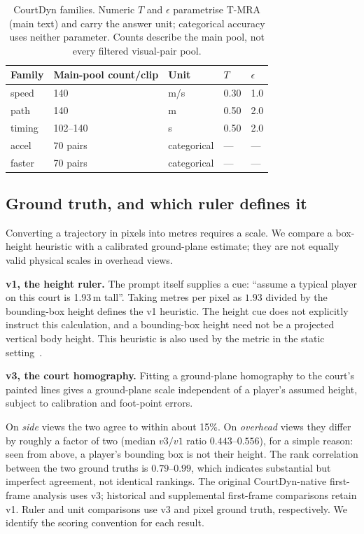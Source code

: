 \documentclass[11pt]{article}
\begin{document}
\begin{table}[t]
\centering
\caption{CourtDyn families. Numeric $T$ and $\epsilon$ parametrise T-MRA (main text)
  and carry the answer unit; categorical accuracy uses neither parameter.
  Counts describe the main pool, not every filtered visual-pair pool.}
\label{tab:families}
\small
\begin{tabular}{lllll}
\toprule
Family & Main-pool count/clip & Unit & $T$ & $\epsilon$ \\
\midrule
speed & 140 & m/s & 0.30 & 1.0 \\
path & 140 & m & 0.50 & 2.0 \\
timing & 102--140 & s & 0.50 & 2.0 \\
accel & 70 pairs & categorical & --- & --- \\
faster & 70 pairs & categorical & --- & --- \\
\bottomrule
\end{tabular}
\end{table}

\subsection{Ground truth, and which ruler defines it}
\label{sec:gt}

Converting a trajectory in pixels into metres requires a scale. We compare a box-height heuristic with a calibrated ground-plane estimate;
they are not equally valid physical scales in overhead views.

\textbf{v1, the height ruler.} The prompt itself supplies a cue: ``assume a
typical player on this court is 1.93\,m tall''. Taking metres per pixel as
$1.93$ divided by the bounding-box height defines the v1 heuristic. The height cue does not explicitly instruct this
calculation, and a bounding-box height need not be a projected vertical body
height. This heuristic is also used by the metric in the static
setting~\cite{courtsi2026}.

\textbf{v3, the court homography.} Fitting a ground-plane homography to the
court's painted lines gives a ground-plane scale independent of a player's assumed height,
subject to calibration and foot-point errors.

On \emph{side} views the two agree to within about 15\%. On \emph{overhead}
views they differ by roughly a factor of two (median $v3/v1$ ratio
$0.443$--$0.556$), for a simple reason: seen from above, a player's bounding box
is not their height. The rank correlation between the two ground truths is
$0.79$--$0.99$, which indicates substantial but imperfect agreement, not identical rankings.
The original CourtDyn-native first-frame analysis uses v3; historical and
supplemental first-frame comparisons retain v1. Ruler and unit comparisons use
v3 and pixel ground truth, respectively. We identify the scoring convention for each result.
\end{document}

